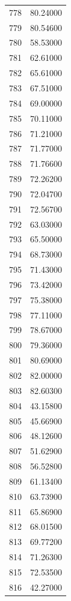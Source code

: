 \documentclass[
  letterpaper,
  DIV=11,
  numbers=noendperiod]{scrreprt}
\begin{document}
\begin{tcolorbox}
\begin{tabular}{lr}
778  &         80.24000 \\
779  &         80.54600 \\
780  &         58.53000 \\
781  &         62.61000 \\
782  &         65.61000 \\
783  &         67.51000 \\
784  &         69.00000 \\
785  &         70.11000 \\
786  &         71.21000 \\
787  &         71.77000 \\
788  &         71.76600 \\
789  &         72.26200 \\
790  &         72.04700 \\
791  &         72.56700 \\
792  &         63.03000 \\
793  &         65.50000 \\
794  &         68.73000 \\
795  &         71.43000 \\
796  &         73.42000 \\
797  &         75.38000 \\
798  &         77.11000 \\
799  &         78.67000 \\
800  &         79.36000 \\
801  &         80.69000 \\
802  &         82.00000 \\
803  &         82.60300 \\
804  &         43.15800 \\
805  &         45.66900 \\
806  &         48.12600 \\
807  &         51.62900 \\
808  &         56.52800 \\
809  &         61.13400 \\
810  &         63.73900 \\
811  &         65.86900 \\
812  &         68.01500 \\
813  &         69.77200 \\
814  &         71.26300 \\
815  &         72.53500 \\
816  &         42.27000 \\

\end{tabular}
\end{tcolorbox}
\end{document}
